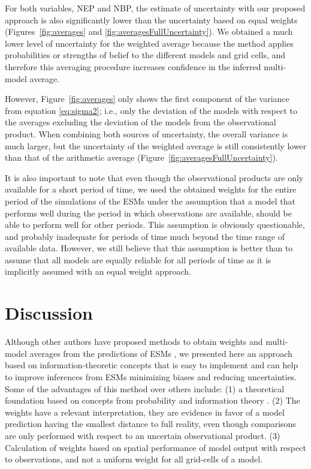 \documentclass[gmd, manuscript]{copernicus}
\begin{document}
For both variables, NEP and NBP, the estimate of uncertainty with our proposed approach is also significantly lower than the uncertainty based on equal weights (Figures~\ref{fig:averages} and \ref{fig:averagesFullUncertainty}). We obtained a much lower level of uncertainty for the weighted average because the method applies probabilities or strengths of belief to the different models and grid cells, and therefore this averaging procedure increases confidence in the inferred multi-model average. 

However, Figure~\ref{fig:averages} only shows the first component of the variance from equation \ref{eq:sigma2}; i.e., only the deviation of the models with respect to the averages excluding the deviation of the models from the observational product. When combining both sources of uncertainty, the overall variance is much larger, but the uncertainty of the weighted average is still consistently lower than that of the arithmetic average (Figure~\ref{fig:averagesFullUncertainty}). 

It is also important to note that even though the observational products are only available for a short period of time, we used the obtained weights for the entire period of the simulations of the ESMs under the assumption that a model that performs well during the period in which observations are available, should be able to perform well for other periods. This assumption is obviously questionable, and probably inadequate for periods of time much beyond the time range of available data. However, we still believe that this assumption is better than to assume that all models are equally reliable for all periods of time as it is implicitly assumed with an equal weight approach. 

\section{Discussion}
Although other authors have proposed methods to obtain weights and multi-model averages from the predictions of ESMs \citep[and references therein]{Tebaldi2007}, we presented here an approach based on information-theoretic concepts that is easy to implement and can help to improve inferences from ESMs minimizing biases and reducing uncertainties. 
Some of the advantages of this method over others include: (1) a theoretical foundation based on concepts from probability and information theory \citep{Akaike1974, Akaike1981, Anderson2007, Burnham2002}. (2) The weights have a relevant interpretation, they are evidence in favor of a model prediction having the smallest distance to full reality, even though comparisons are only performed with respect to an uncertain observational product. 
(3) Calculation of weights based on spatial performance of model output with respect to observations, and not a uniform weight for all grid-cells of a model.
\end{document}
